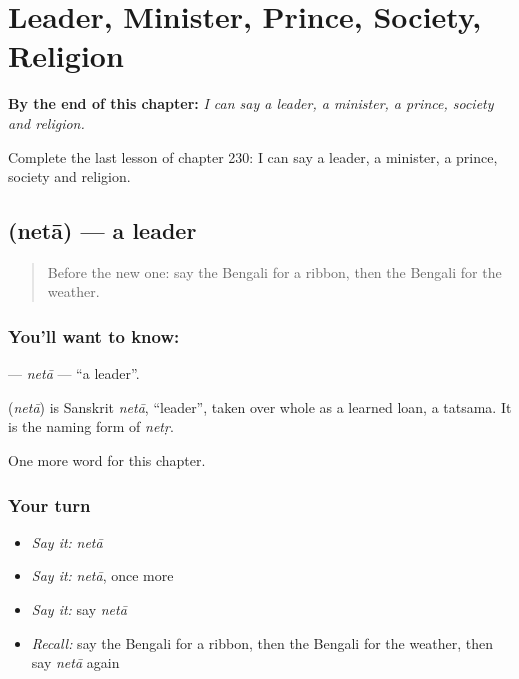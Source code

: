 
\chapter{Leader, Minister, Prince, Society, Religion}
\label{ch:bn-leader-minister-prince-society-religion}

\begin{chapteropening}
\textbf{By the end of this chapter:} \emph{I can say a leader, a minister, a prince, society and religion.}

Complete the last lesson of chapter 230: I can say a leader, a minister, a prince, society and religion.
\end{chapteropening}

\section[\texorpdfstring{\bn{নেতা} (netā)}{নেতা (netā)}]{ (netā) — a leader}

\label{lesson:BN-C230-neta}



\begin{quote}
Before the new one: say the Bengali for a ribbon, then the Bengali for the weather.
\end{quote}

\subsection*{You'll want to know: }
\textbf{} — \emph{netā} — \textquotedblleft{}a leader\textquotedblright{}.

\begin{cousinweb}
\textbf{} (\emph{netā}) is Sanskrit \emph{netā}, \textquotedblleft{}leader\textquotedblright{}, taken over whole as a learned loan, a tatsama. It is the naming form of \emph{netṛ}.
\end{cousinweb}

\begin{grammarlens}[title={What you've built}]
One more word for this chapter.
\end{grammarlens}

\subsection*{Your turn}
\begin{itemize}
\raggedright
  \item \emph{Say it:} \emph{netā}
  \item \emph{Say it:} \emph{netā}, once more
  \item \emph{Say it:} say \emph{netā}
  \item \emph{Recall:} say the Bengali for a ribbon, then the Bengali for the weather, then say \emph{netā} again
\end{itemize}

